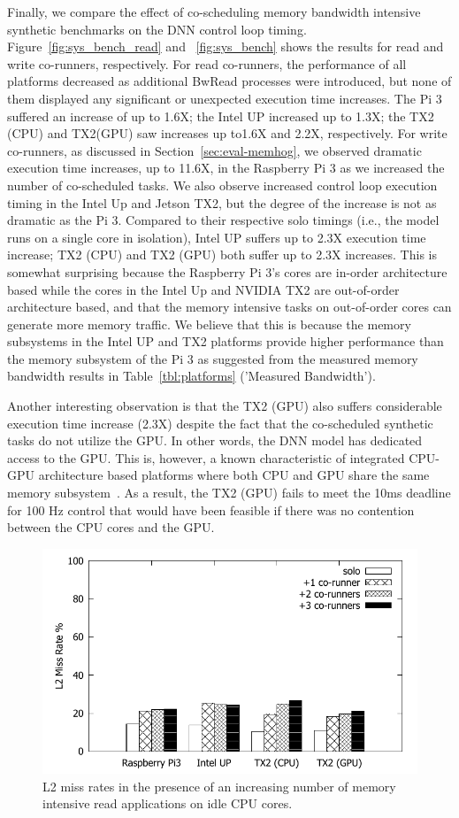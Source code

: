 Finally, we compare the effect of co-scheduling memory bandwidth
intensive synthetic benchmarks on the DNN control loop timing. 
Figure~\ref{fig:sys_bench_read} and ~\ref{fig:sys_bench} shows 
the results for read and write co-runners, respectively. For read co-runners,
the performance of all platforms decreased as additional BwRead processes
were introduced, but none of them displayed any significant or unexpected
execution time increases. The Pi 3 suffered an increase of up to 1.6X; the 
Intel UP increased up to 1.3X; the TX2 (CPU) and TX2(GPU) saw increases 
up to1.6X and 2.2X, respectively. For write co-runners, as discussed in 
Section~\ref{sec:eval-memhog}, we observed dramatic execution time
increases, up to 11.6X, in the Raspberry Pi 3 as we increased the number of
co-scheduled tasks. We also observe increased control loop execution
timing in the Intel Up and Jetson TX2, but the degree of the increase is 
not as dramatic as the Pi 3. Compared to their respective solo timings 
(i.e., the model runs on a single core in isolation), Intel UP suffers up to
2.3X execution time increase; TX2 (CPU) and TX2 (GPU) both suffer up to
2.3X increases. This is somewhat surprising
because the Raspberry Pi 3's cores are in-order architecture based while
the cores in the Intel Up and NVIDIA TX2 are out-of-order architecture
based, and that the memory intensive tasks on out-of-order cores can
generate more memory traffic. We believe that this is because the
memory subsystems in the Intel UP and TX2 platforms provide higher
performance than the memory subsystem of the Pi 3 as suggested from
the measured memory bandwidth results in Table~\ref{tbl:platforms}
('Measured Bandwidth').

Another interesting observation is that the TX2 (GPU) also suffers
considerable execution time increase (2.3X) despite the fact that the
co-scheduled synthetic tasks do not utilize the GPU. In other words,
the DNN model has dedicated access to the GPU. This is, however, a
known characteristic of integrated CPU-GPU architecture based
platforms where both CPU and GPU share the same memory
subsystem~\cite{Ali2017}. As a result, the TX2 (GPU) fails to meet the
10ms deadline for 100 Hz control that would have been feasible if
there was no contention between the CPU cores and the GPU.

\begin{figure}[h]
  \centering
  \includegraphics[width=.45\textwidth]{figs/compare_readl2}
  \caption{L2 miss rates in the presence of an increasing number of 
			memory intensive read applications on idle CPU cores.}
  \label{fig:sys_readl2miss}
\end{figure}

